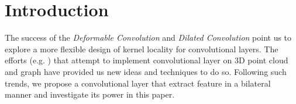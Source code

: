 \section{Introduction}
The success of the \emph{Deformable Convolution} \cite{deformconv} and \emph{Dilated Convolution} \cite{dilatedconv} point us to explore a more flexible design of kernel locality for convolutional layers. 
The efforts (e.g. \cite{continueconv,feastnet} ) that attempt to implement convolutional layer on 3D point cloud and graph have provided us new ideas and techniques to do so. 
Following such trends, we propose a convolutional layer that extract feature in a bilateral manner and investigate its power in this paper.
  